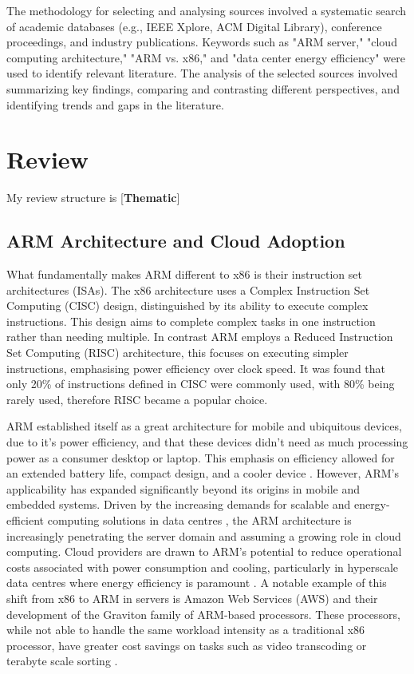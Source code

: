 \documentclass[conference]{IEEEtran}  %
\begin{document}
The methodology for selecting and analysing sources involved a systematic search of academic databases (e.g., IEEE Xplore, ACM Digital Library), conference proceedings, and industry publications. Keywords such as "ARM server," "cloud computing architecture," "ARM vs. x86," and "data center energy efficiency" were used to identify relevant literature. The analysis of the selected sources involved summarizing key findings, comparing and contrasting different perspectives, and identifying trends and gaps in the literature.


\section{Review} %

My review structure is [\textbf{Thematic}]
\subsection{ARM Architecture and Cloud Adoption}
What fundamentally makes ARM different to x86 is their instruction set architectures (ISAs).
The x86 architecture uses a Complex Instruction Set Computing (CISC) design, distinguished by its ability to execute complex instructions.
This design aims to complete complex tasks in one instruction rather than needing multiple. 
In contrast ARM employs a Reduced Instruction Set Computing (RISC) architecture, this focuses on executing simpler instructions, emphasising power efficiency over clock speed. \cite{ARM_RISC_vs_x86_CISC}
It was found that only 20\% of instructions defined in CISC were commonly used, with 80\% being rarely used, therefore RISC became a popular choice. \cite{instructions_CISC_vs_RISC}

ARM established itself as a great architecture for mobile and ubiquitous devices, due to it's power efficiency, and that these devices didn't need as much processing power as a consumer desktop or laptop.
This emphasis on efficiency allowed for an extended battery life, compact design, and a cooler device \cite{furber1988advantages}.
However, ARM's applicability has expanded significantly beyond its origins in mobile and embedded systems. Driven by the increasing demands for scalable and energy-efficient computing solutions in data centres \cite{ARM_to_server}, the ARM architecture is increasingly penetrating the server domain and assuming a growing role in cloud computing. Cloud providers are drawn to ARM's potential to reduce operational costs associated with power consumption and cooling, particularly in hyperscale data centres where energy efficiency is paramount \cite{datacentre_energy}. 
A notable example of this shift from x86 to ARM in servers is Amazon Web Services (AWS) and their development of the Graviton family of ARM-based processors.
These processors, while not able to handle the same workload intensity as a traditional x86 processor, have greater cost savings on tasks such as video transcoding or terabyte scale sorting \cite{AWS_ARM}.
\end{document}
